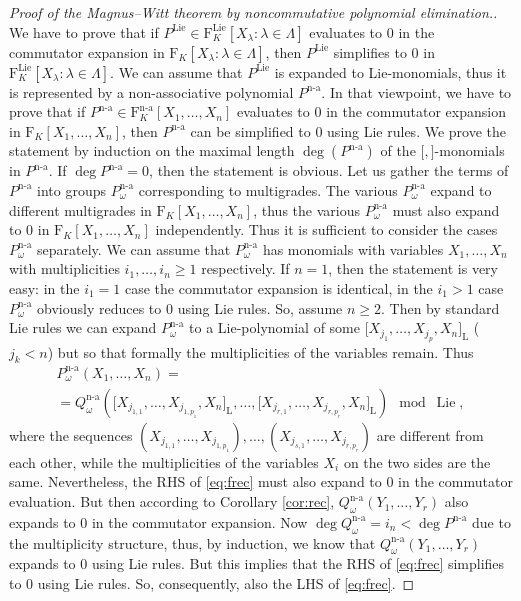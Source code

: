 \documentclass[11pt,a4paper]{amsart}
\newcommand{\plabel}[1]{ \label{#1}}
\newcommand{\plabel}[1]{ \label{#1}\rlap{\smash{${}^{^{[#1]}}$}}}
\newcommand{\plabel}[1]{ \label{#1}}
\DeclareMathOperator{\nonass}{n-a}
\DeclareMathOperator{\Lie}{Lie}
\newcommand{\bo}{\boldsymbol}
\theoremstyle{definition}
\theoremstyle{plain}
\begin{document}
\begin{proof}[Proof of the Magnus--Witt theorem by noncommutative polynomial elimination.]
We have to prove that if $P^{\Lie}\in\mathrm F^{\Lie}_K[X_\lambda:\lambda\in\Lambda]$ evaluates to $0$
 in the commutator expansion in $\mathrm F_K[X_\lambda:\lambda\in\Lambda]$, then
 $P^{\Lie}$ simplifies to $0$ in $\mathrm F^{\Lie}_K[X_\lambda:\lambda\in\Lambda]$.
We can assume that $P^{\Lie}$ is expanded to Lie-monomials, thus it is represented by a non-associative polynomial $P^{\nonass}$.
In that viewpoint, we have to prove that if $P^{\nonass}\in\mathrm F^{\nonass}_K[X_1,\ldots,X_n]$
 evaluates to $0$ in the commutator expansion in $\mathrm F_K[X_1,\ldots,X_n]$, then
 $P^{\nonass}$ can be simplified to $0$ using Lie rules.
We prove the statement by induction on the maximal length $\deg(P^{\nonass})$ of the $\bo[,\bo]$-monomials in  $P^{\nonass}$.
If $\deg P^{\nonass}=0$, then the statement is obvious.
Let us gather the terms of $P^{\nonass}$ into groups $P_\omega^{\nonass}$ corresponding to multigrades.
The various $P_\omega^{\nonass}$ expand to different multigrades in  $\mathrm F_K[X_1,\ldots,X_n]$,
 thus the various $P_\omega^{\nonass}$ must also expand to $0$ in $\mathrm F_K[X_1,\ldots,X_n]$ independently.
Thus it is sufficient to consider the cases $P_\omega^{\nonass}$ separately.
We can assume that $P^{\nonass}_\omega$ has monomials with variables $X_1,\ldots, X_n$
 with multiplicities $i_1,\ldots,i_n\geq1$ respectively.
If $n=1$, then the statement is very easy: in the  $i_1=1$ case the commutator expansion is identical,
 in the $i_1>1$ case $P_\omega^{\nonass}$ obviously reduces to $0$ using Lie rules.
So, assume $n\geq2$.
Then by standard Lie rules we can expand $P_\omega^{\nonass}$ to a Lie-polynomial of
 some $\bo[X_{j_1}, \ldots,X_{j_p} ,X_n\bo]_{\mathrm L}$
 ($j_k<n$) but so that formally the multiplicities of the variables remain.
Thus
\begin{multline}
P^{\nonass}_\omega(X_1,\ldots ,X_n)=\\=Q^{\nonass}_\omega( \bo[X_{j_{1,1}}, \ldots,X_{j_{1,p_1}} ,X_n\bo]_{\mathrm L}, \ldots , \bo[X_{j_{r,1}}, \ldots,X_{j_{r,p_r}} ,X_n\bo]_{\mathrm L} )\mod\Lie,
\plabel{eq:frec}
\end{multline}
 where the sequences $(X_{j_{1,1}}, \ldots,X_{j_{1,p_1}}),\ldots,(X_{j_{s,1}}, \ldots,X_{j_{r,p_r}} ) $ are different from each other,
 while the  multiplicities of  the variables $X_i$ on the two sides are the same.
Nevertheless, the RHS of \eqref{eq:frec} must also expand to $0$ in the commutator evaluation.
But then according to Corollary \ref{cor:rec}, $Q^{\nonass}_\omega(Y_1,\ldots,Y_r)$ also expands to $0$ in the commutator expansion.
Now $\deg Q^{\nonass}_\omega=i_n<\deg P^{\nonass}$ due to the multiplicity structure,
 thus, by induction, we know that  $Q^{\nonass}_\omega(Y_1,\ldots,Y_r)$ expands to $0$ using Lie rules.
But this implies that the RHS of  \eqref{eq:frec} simplifies to $0$ using Lie rules.
So, consequently, also the LHS of  \eqref{eq:frec}.
\end{proof}
\end{document}
